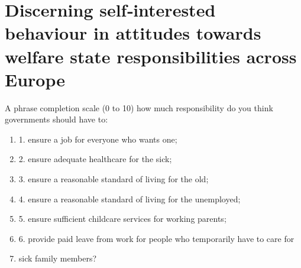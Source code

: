\section*{Discerning self‐interested behaviour in attitudes towards welfare state responsibilities across Europe \cite{baslevent_discerning_2011}}
A phrase completion scale (0 to 10)
 how much responsibility do you think governments should have to:
\begin{enumerate}
\item  1. ensure a job for everyone who wants one; 
\item  2. ensure adequate healthcare for the sick;
\item  3.  ensure a reasonable standard of living for the old; 
\item  4.  ensure a reasonable standard of living for the unemployed;
\item  5.  ensure sufficient childcare services for working parents; 
\item  6.  provide paid leave from work for people who  temporarily have to care for
\item sick family members?
\end{enumerate}
